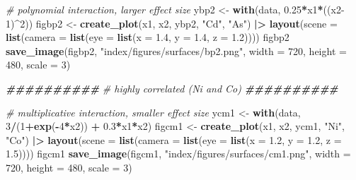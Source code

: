 \documentclass[12pt, twoside]{amherstthesis}
\newenvironment{Shaded}{\begin{snugshade}}{\end{snugshade}}
\newcommand{\AttributeTok}[1]{\textcolor[rgb]{0.13,0.29,0.53}{#1}}
\newcommand{\CommentTok}[1]{\textcolor[rgb]{0.56,0.35,0.01}{\textit{#1}}}
\newcommand{\DecValTok}[1]{\textcolor[rgb]{0.00,0.00,0.81}{#1}}
\newcommand{\DocumentationTok}[1]{\textcolor[rgb]{0.56,0.35,0.01}{\textbf{\textit{#1}}}}
\newcommand{\FloatTok}[1]{\textcolor[rgb]{0.00,0.00,0.81}{#1}}
\newcommand{\FunctionTok}[1]{\textcolor[rgb]{0.13,0.29,0.53}{\textbf{#1}}}
\newcommand{\NormalTok}[1]{#1}
\newcommand{\OtherTok}[1]{\textcolor[rgb]{0.56,0.35,0.01}{#1}}
\newcommand{\SpecialCharTok}[1]{\textcolor[rgb]{0.81,0.36,0.00}{\textbf{#1}}}
\newcommand{\StringTok}[1]{\textcolor[rgb]{0.31,0.60,0.02}{#1}}
\begin{document}
\begin{Shaded}
\begin{Highlighting}[]
\CommentTok{\# polynomial interaction, larger effect size}
\NormalTok{ybp2 }\OtherTok{\textless{}{-}} \FunctionTok{with}\NormalTok{(data, }\FloatTok{0.25}\SpecialCharTok{*}\NormalTok{x1}\SpecialCharTok{*}\NormalTok{((x2}\DecValTok{{-}1}\NormalTok{)}\SpecialCharTok{\^{}}\DecValTok{2}\NormalTok{))}
\NormalTok{figbp2 }\OtherTok{\textless{}{-}} \FunctionTok{create\_plot}\NormalTok{(x1, x2, ybp2, }\StringTok{"Cd"}\NormalTok{, }\StringTok{"As"}\NormalTok{) }\SpecialCharTok{|\textgreater{}} 
  \FunctionTok{layout}\NormalTok{(}\AttributeTok{scene =} \FunctionTok{list}\NormalTok{(}\AttributeTok{camera =} \FunctionTok{list}\NormalTok{(}\AttributeTok{eye =} \FunctionTok{list}\NormalTok{(}\AttributeTok{x =} \FloatTok{1.4}\NormalTok{, }\AttributeTok{y =} \FloatTok{1.4}\NormalTok{, }\AttributeTok{z =} \FloatTok{1.2}\NormalTok{))))}
\NormalTok{figbp2}
\FunctionTok{save\_image}\NormalTok{(figbp2, }\StringTok{"index/figures/surfaces/bp2.png"}\NormalTok{, }
           \AttributeTok{width =} \DecValTok{720}\NormalTok{, }\AttributeTok{height =} \DecValTok{480}\NormalTok{, }\AttributeTok{scale =} \DecValTok{3}\NormalTok{)}

\DocumentationTok{\#\#\#\#\#\#\#\#\#\#}
\CommentTok{\# highly correlated (Ni and Co)}
\DocumentationTok{\#\#\#\#\#\#\#\#\#\#}

\CommentTok{\# multiplicative interaction, smaller effect size}
\NormalTok{ycm1 }\OtherTok{\textless{}{-}} \FunctionTok{with}\NormalTok{(data, }\DecValTok{3}\SpecialCharTok{/}\NormalTok{(}\DecValTok{1}\SpecialCharTok{+}\FunctionTok{exp}\NormalTok{(}\SpecialCharTok{{-}}\DecValTok{4}\SpecialCharTok{*}\NormalTok{x2)) }\SpecialCharTok{+} \FloatTok{0.3}\SpecialCharTok{*}\NormalTok{x1}\SpecialCharTok{*}\NormalTok{x2) }
\NormalTok{figcm1 }\OtherTok{\textless{}{-}} \FunctionTok{create\_plot}\NormalTok{(x1, x2, ycm1, }\StringTok{"Ni"}\NormalTok{, }\StringTok{"Co"}\NormalTok{) }\SpecialCharTok{|\textgreater{}} 
  \FunctionTok{layout}\NormalTok{(}\AttributeTok{scene =} \FunctionTok{list}\NormalTok{(}\AttributeTok{camera =} \FunctionTok{list}\NormalTok{(}\AttributeTok{eye =} \FunctionTok{list}\NormalTok{(}\AttributeTok{x =} \FloatTok{1.2}\NormalTok{, }\AttributeTok{y =} \FloatTok{1.2}\NormalTok{, }\AttributeTok{z =} \FloatTok{1.5}\NormalTok{))))}
\NormalTok{figcm1}
\FunctionTok{save\_image}\NormalTok{(figcm1, }\StringTok{"index/figures/surfaces/cm1.png"}\NormalTok{, }
           \AttributeTok{width =} \DecValTok{720}\NormalTok{, }\AttributeTok{height =} \DecValTok{480}\NormalTok{, }\AttributeTok{scale =} \DecValTok{3}\NormalTok{)}


\end{Highlighting}
\end{Shaded}
\end{document}
